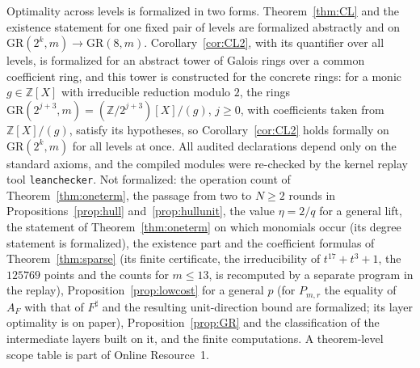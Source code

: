 \documentclass[11pt]{article}
\theoremstyle{definition}
\theoremstyle{remark}
\newcommand{\Z}{\mathbb{Z}}
\newcommand{\GR}{\mathrm{GR}}
\begin{document}
Optimality across levels is formalized in two forms. Theorem~\ref{thm:CL} and the existence statement for one fixed
pair of levels are formalized abstractly and on $\GR(2^k,m)\to\GR(8,m)$. Corollary~\ref{cor:CL2}, with its quantifier
over all levels, is formalized for an abstract tower of Galois rings over a common coefficient ring, and this tower
is constructed for the concrete rings: for a monic $g\in\Z[X]$ with irreducible reduction modulo $2$, the rings
$\GR(2^{j+3},m)=(\Z/2^{j+3})[X]/(g)$, $j\ge0$, with coefficients taken from $\Z[X]/(g)$, satisfy its hypotheses, so
Corollary~\ref{cor:CL2} holds formally on $\GR(2^k,m)$ for all levels at once. All audited declarations depend only on the standard axioms,
and the compiled modules were re-checked by the kernel replay tool \texttt{leanchecker}. Not formalized: the operation
count of Theorem~\ref{thm:oneterm}, the passage from two to $N\ge2$ rounds in Propositions~\ref{prop:hull}
and~\ref{prop:hullunit}, the value $\eta=2/q$ for a general lift, the statement of
Theorem~\ref{thm:oneterm} on which monomials occur (its degree statement is formalized), the existence part and the
coefficient formulas of Theorem~\ref{thm:sparse} (its finite certificate, the irreducibility of $t^{17}+t^3+1$, the
$125769$ points and the counts for $m\le13$, is recomputed by a separate program in the replay),
Proposition~\ref{prop:lowcost} for a general $p$ (for $P_{m,r}$ the equality of $A_F$ with that of $F^\sharp$ and the
resulting unit-direction bound are formalized; its layer optimality is on paper), Proposition~\ref{prop:GR} and the classification of the intermediate layers built on it, and the
finite computations. A theorem-level scope table is
part of Online Resource~1.
\end{document}
